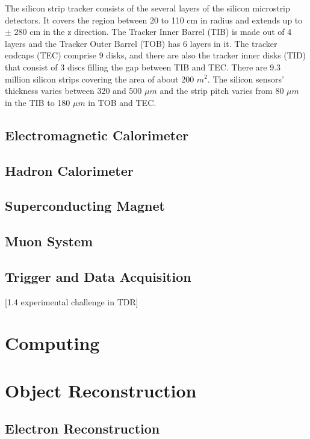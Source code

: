 The silicon strip tracker consists of the several layers of the silicon microstrip detectors. It covers the region
between 20 to 110 cm in radius and extends up to $\pm$ 280 cm in the z direction. The Tracker Inner Barrel (TIB) is made
out of 4 layers and the Tracker Outer Barrel (TOB) has 6 layers in it. The tracker endcaps (TEC) comprise 9 disks, and
there are also the tracker inner disks (TID) that consist of 3 discs filling the gap between TIB and TEC. There are 9.3
million silicon strips covering the area of about 200 $m^2$. The silicon sensors' thickness varies between 320
and 500 $\mu m$ and the strip pitch varies from 80 $\mu m$ in the TIB to 180 $\mu m$ in TOB and TEC.

\subsection{Electromagnetic Calorimeter}

\subsection{Hadron Calorimeter}

\subsection{Superconducting Magnet}

\subsection{Muon System}

\subsection{Trigger and Data Acquisition}
[1.4 experimental challenge in TDR]

\section{Computing}

\section{Object Reconstruction}

\subsection{Electron Reconstruction}

